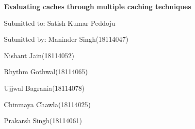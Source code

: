 \documentclass[12pt]{article}
\begin{document}
\begin{Center}
{\fontsize{16pt}{19.2pt}\selectfont \textbf{Evaluating caches through multiple caching techniques}\par}
\end{Center}\par


\vspace{\baselineskip}
{\fontsize{14pt}{16.8pt}\selectfont Submitted to: \tab Satish Kumar Peddoju\par}\par

{\fontsize{14pt}{16.8pt}\selectfont Submitted by: \tab Maninder Singh\tab (18114047)\par}\par

\begin{adjustwidth}{1.0in}{0.0in}
{\fontsize{14pt}{16.8pt}\selectfont Nishant Jain\tab \tab (18114052)\par}\par

\end{adjustwidth}

\begin{adjustwidth}{1.0in}{0.0in}
{\fontsize{14pt}{16.8pt}\selectfont Rhythm Gothwal\tab (18114065)\par}\par

\end{adjustwidth}

\begin{adjustwidth}{1.0in}{0.0in}
{\fontsize{14pt}{16.8pt}\selectfont Ujjwal Bagrania\tab (18114078)\par}\par

\end{adjustwidth}

\begin{adjustwidth}{1.0in}{0.0in}
{\fontsize{14pt}{16.8pt}\selectfont Chinmaya Chawla\tab (18114025)\par}\par

\end{adjustwidth}

\begin{adjustwidth}{1.0in}{0.0in}
{\fontsize{14pt}{16.8pt}\selectfont Prakarsh Singh\tab (18114061)\par}\par

\end{adjustwidth}
\end{document}
